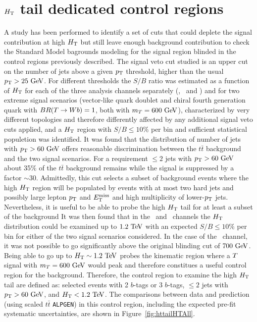 
\clearpage

\section{$\HT$ tail dedicated control regions}\label{app:htx_httail}

A study has been performed to identify a set of cuts that could deplete the signal
contribution at high $\HT$ but still leave enough background contribution 
to check the Standard Model bagrounds modeling for the signal region blinded
in the control regions previously described. 
The signal veto cut studied is an upper cut on the number 
of jets above a given $\pt$ threshold, higher than the usual $\pt>25\gev$. 
For different thresholds
the $S/B$ ratio was estimated as a function of $\HT$ for 
each of the three analysis channels separately (\chii, \chiii\ and \chiv) 
and for two extreme signal scenarios (vector-like quark doublet and chiral 
fourth generation quark with $BR(\T \to Wb)=1$, both with $m_{\T}=600\gev$),
characterized by very different topologies and therefore differently affected by any additional
signal veto cuts applied, and a $\HT$ region with $S/B\leq 10\%$ per bin
and sufficient statistical populetion was identified.
It was found that the distribution of number of 
jets with $\pt>60\gev$ offers reasonable discrimination 
between the $t\bar{t}$ background and the two 
signal scenarios.%
For a requirement $\leq 2$ jets with $\pt>60\gev$ 
about 35\% of the $t\bar{t}$ background remains while the signal is suppressed
by a factor $\sim 30$. 
Admittedly, this cut selects a subset of background events where the high $\HT$ region will be populated
by events with at most two hard jets and possibly large lepton $\pt$ and $\met$ and high multiplicity of lower-$\pt$ jets. 
Nevertheless, it is useful to be able to probe the high $\HT$ tail for at least a subset of the background
It was then found that in the \chii\ and \chiii\ channels the $\HT$ distribution 
could be examined  up to $1.2\tev$ with an expected $S/B\leq 10\%$ per bin for 
either of the two signal scenarios considered. In the case of the \chiv\ channel, 
it was not possible to go significantly
above the original blinding cut of $700\gev$. 
Being able to go up to $\HT\sim 1.2\tev$ probes the kinematic region where a $\T$
signal with $m_{\T}=600\gev$ would peak and therefore constitues a useful control region for the background.
Therefore, the control region to examine the high $\HT$ tail are defined as: selected events with 2 $b$-tags or  3 $b$-tags, 
$\leq 2$ jets with $\pt>60\gev$, and $\HT<1.2\tev$.  
The comparisons between data and prediction (using scaled $t\bar{t}$ \texttt{ALPGEN}) 
in this control region, including the expected pre-fit systematic uncertainties, are shown
in Figure~\ref{fig:httailHTAll}.


